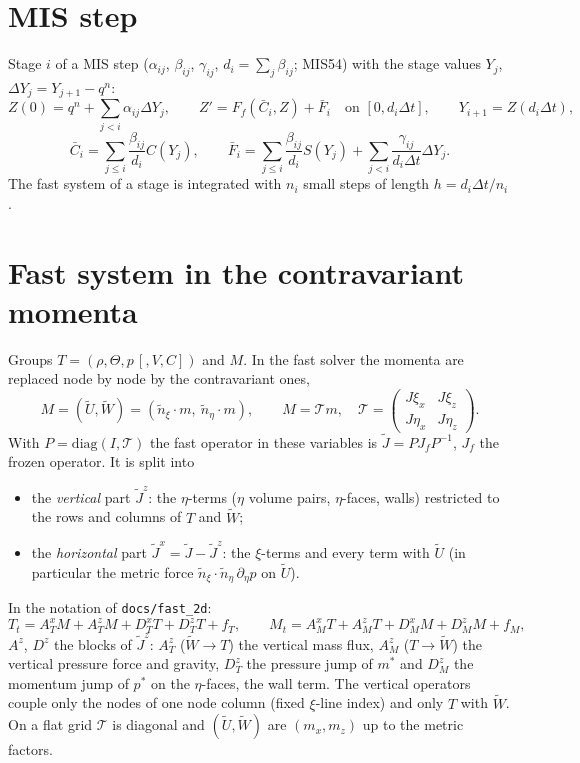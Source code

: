\documentclass[11pt,a4paper]{article}
\newcommand{\dt}{\Delta t}
\newcommand{\code}[1]{\texttt{#1}}
\begin{document}
\section{MIS step}
Stage $i$ of a MIS step ($\alpha_{ij}$, $\beta_{ij}$, $\gamma_{ij}$, $d_i=\sum_j\beta_{ij}$; MIS54) with the stage values $Y_j$, $\Delta Y_j=Y_{j+1}-q^n$:
\[
Z(0)=q^n+\sum_{j<i}\alpha_{ij}\Delta Y_j,\qquad
Z'=F_f(\bar C_i,Z)+\bar F_i\quad\text{on }[0,d_i\dt],\qquad Y_{i+1}=Z(d_i\dt),
\]
\[
\bar C_i=\sum_{j\le i}\frac{\beta_{ij}}{d_i}C(Y_j),\qquad \bar F_i=\sum_{j\le i}\frac{\beta_{ij}}{d_i}S(Y_j)+\sum_{j<i}\frac{\gamma_{ij}}{d_i\dt}\Delta Y_j .
\]
The fast system of a stage is integrated with $n_i$ small steps of length $h=d_i\dt/n_i$.

\section{Fast system in the contravariant momenta}
Groups $T=(\rho,\Theta,p\,[,V,C])$ and $M$. In the fast solver the momenta are replaced node by node by the contravariant ones,
\[
M=(\tilde U,\tilde W)=(\tilde n_\xi\cdot m,\ \tilde n_\eta\cdot m),\qquad M=\mathcal T m,\quad \mathcal T=\begin{pmatrix}J\xi_x&J\xi_z\\J\eta_x&J\eta_z\end{pmatrix}.
\]
With $P=\mathrm{diag}(I,\mathcal T)$ the fast operator in these variables is $\tilde J=PJ_fP^{-1}$, $J_f$ the frozen operator. It is split into
\begin{itemize}
\item the \emph{vertical} part $\tilde J^z$: the $\eta$-terms ($\eta$ volume pairs, $\eta$-faces, walls) restricted to the rows and columns of $T$ and $\tilde W$;
\item the \emph{horizontal} part $\tilde J^x=\tilde J-\tilde J^z$: the $\xi$-terms and every term with $\tilde U$ (in particular the metric force $\tilde n_\xi\cdot\tilde n_\eta\,\partial_\eta p$ on $\tilde U$).
\end{itemize}
In the notation of \code{docs/fast\_2d}:
\[
T_t=A_T^xM+A_T^zM+D_T^xT+D_T^zT+f_T,\qquad M_t=A_M^xT+A_M^zT+D_M^xM+D_M^zM+f_M,
\]
$A^z$, $D^z$ the blocks of $\tilde J^z$: $A_T^z$ ($\tilde W\to T$) the vertical mass flux, $A_M^z$ ($T\to\tilde W$) the vertical pressure force and gravity,
$D_T^z$ the pressure jump of $m^*$ and $D_M^z$ the momentum jump of $p^*$ on the $\eta$-faces, the wall term. The vertical operators couple only the
nodes of one node column (fixed $\xi$-line index) and only $T$ with $\tilde W$. On a flat grid $\mathcal T$ is diagonal and $(\tilde U,\tilde W)$ are
$(m_x,m_z)$ up to the metric factors.
\end{document}
